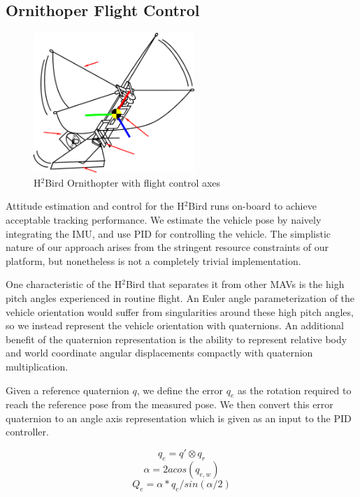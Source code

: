 \documentclass{aamas2013}
\begin{document}
\subsection{Ornithoper Flight Control}

\begin{figure}[tb]
\centering
\includegraphics[height=150pt]{figures/h2bird_axes.pdf}
\caption{H$^2$Bird Ornithopter with flight control axes}
\label{fig:h2Bird_axes}
\end{figure}

Attitude estimation and control for the H$^2$Bird runs on-board to achieve 
acceptable tracking performance. We estimate the vehicle pose by naively
integrating the IMU, and use PID for controlling the vehicle. The simplistic 
nature of our approach arises from the stringent resource constraints 
of our platform, but nonetheless is not a completely trivial implementation.

One characteristic of the H$^2$Bird that separates it from other MAVs is the
high pitch angles experienced in routine flight. An Euler angle 
parameterization of the vehicle orientation would suffer from singularities
around these high pitch angles, so we instead represent the vehicle orientation
with quaternions. An additional benefit of the quaternion representation is 
the ability to represent relative body and world coordinate angular displacements 
compactly with quaternion multiplication.~\cite{bowman:reasoning} 

Given a reference quaternion $q$, we define the error $q_e$ as the rotation 
required to reach the reference pose from the measured pose. We then 
convert this error quaternion to an angle axis representation which is given
as an input to the PID controller. 

\begin{equation}
\label{quat_error}
q_e = q'\otimes q_r
\end{equation}
\begin{equation}
\label{quat_angle}
\alpha = 2acos(q_{e,w})
\end{equation}
\begin{equation}
\label{quat_linearize}
Q_e = \alpha*q_e/sin(\alpha /2)
\end{equation}
\end{document}

